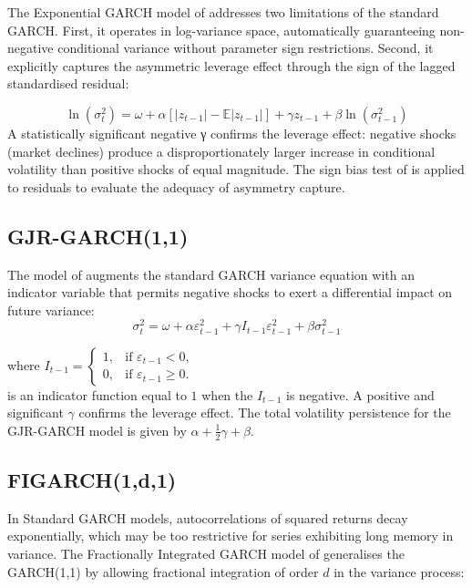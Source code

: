  The Exponential GARCH model of \cite{nelson1991conditional} addresses two limitations of the standard GARCH. First, it operates in log-variance space, automatically guaranteeing non-negative conditional variance without parameter sign restrictions. Second, it explicitly captures the asymmetric leverage effect through the sign of the lagged standardised residual:
 

\begin{equation}
\ln(\sigma_t^2) = \omega + \alpha \left[ |z_{t-1}| - \mathbb{E}|z_{t-1}| \right]
+ \gamma z_{t-1}
+ \beta \ln(\sigma_{t-1}^2)
\end{equation}
A statistically significant negative γ confirms the leverage effect: negative shocks (market declines) produce a disproportionately larger increase in conditional volatility than positive shocks of equal magnitude. The sign bias test of \citet{engle1993} is applied to residuals to evaluate the adequacy of asymmetry capture.

\subsection{GJR-GARCH(1,1)}
 The model of \cite{glosten1993} augments the standard GARCH variance equation with an indicator variable that permits negative shocks to exert a differential impact on future variance:
\begin{equation}
\sigma_t^2
=
\omega
+
\alpha \varepsilon_{t-1}^2
+
\gamma I_{t-1}\varepsilon_{t-1}^2
+
\beta \sigma_{t-1}^2
\end{equation}

where $
I_{t-1}
=
\begin{cases}
1, & \text{if } \varepsilon_{t-1}<0,\\
0, & \text{if } \varepsilon_{t-1}\ge 0.
\end{cases}
$\\

is an indicator function equal to $1$ when the $I_{t-1}$ is negative. A positive and significant
 $\gamma$ confirms the leverage effect. The total volatility persistence for the GJR-GARCH model is given by $\alpha + \frac{1}{2}\gamma + \beta$.

\subsection{FIGARCH(1,d,1)}

 In Standard GARCH models, autocorrelations of squared returns decay exponentially, which may be too restrictive for series exhibiting long memory in variance. The Fractionally Integrated GARCH model of \cite{baillie1996} generalises the GARCH(1,1) by allowing fractional integration of order $d$ in the variance process: 

